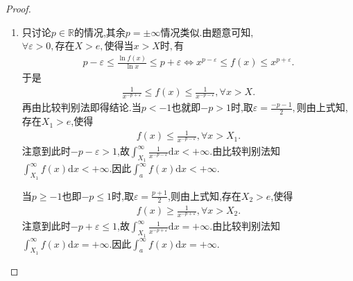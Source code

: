 \documentclass[../../main.tex]{subfiles}%
\begin{document}
\begin{proof}
\begin{enumerate}[(1)]
\item 只讨论$p\in \mathbb{R}$的情况,其余$p=\pm \infty$情况类似.由题意可知,$\forall \varepsilon >0,\text{存在}X>e,\text{使得当}x>X\text{时},\text{有}$
\begin{align*}
p-\varepsilon \leqslant \frac{\ln f\left( x \right)}{\ln x}\leqslant p+\varepsilon \Longleftrightarrow x^{p-\varepsilon}\leqslant f\left( x \right) \leqslant x^{p+\varepsilon}.
\end{align*}
于是
\begin{align*}
\frac{1}{x^{-p+\varepsilon}}\leqslant f\left( x \right) \leqslant \frac{1}{x^{-p-\varepsilon}},\forall x>X.
\end{align*}
再由比较判别法即得结论.当$p<-1$也就即$-p>1$时,取$\varepsilon=\frac{-p-1}{2},$则由上式知,存在$X_1>e$,使得
\begin{align*}
f\left( x \right) \leqslant \frac{1}{x^{-p-\varepsilon}},\forall x>X_1.
\end{align*}
注意到此时$-p-\varepsilon>1$,故$\int_{X_1}^{\infty}{\frac{1}{x^{-p-\varepsilon}}\mathrm{d}x}<+\infty .$由比较判别法知$\int_{X_1}^{\infty}{f\left( x \right) \mathrm{d}x}<+\infty .$因此$\int_{a}^{\infty}{f\left( x \right) \mathrm{d}x}<+\infty .$

当$p\geqslant -1$也即$-p \leqslant 1$时,取$\varepsilon =\frac{p+1}{2}$,则由上式知,存在$X_2>e$,使得
\begin{align*}
f\left( x \right) \geqslant \frac{1}{x^{-p+\varepsilon}},\forall x>X_2.
\end{align*}
注意到此时$-p+\varepsilon \leqslant 1$,故$\int_{X_1}^{\infty}{\frac{1}{x^{-p+\varepsilon}}\mathrm{d}x}=+\infty .$由比较判别法知$\int_{X_1}^{\infty}{f\left( x \right) \mathrm{d}x}=+\infty .$因此$\int_{a}^{\infty}{f\left( x \right) \mathrm{d}x}=+\infty .$

\end{enumerate}
\end{proof}
\end{document}
